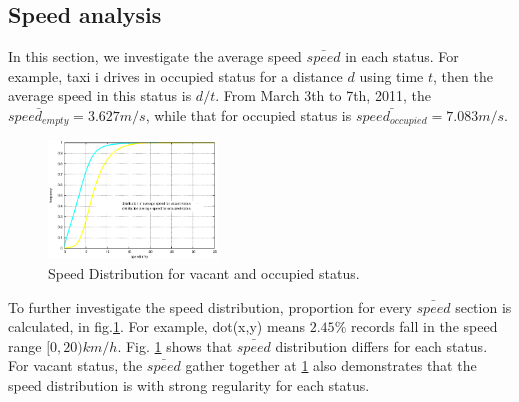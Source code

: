 \subsection{Speed analysis}
In this section, we investigate the average speed $\bar{speed}$ in each status. For example, taxi i drives in occupied status for a distance $d$ using time $t$, then the average speed in this status is $d/t$.
From March 3th to 7th, 2011, the $\bar{speed_{empty}} = 3.627 m/s$, while that for occupied status is $\bar{speed_{occupied}}=7.083 m/s$. 

\begin{figure}
\centering
\includegraphics[width=0.4\textwidth]{figures_201103/assumption/speeddis.eps}
\caption{Speed Distribution for vacant and occupied status.}\label{figure_speed_distribution}
\end{figure}

To further investigate the speed distribution, proportion for every $\bar{speed}$ section is calculated, in fig.\ref{figure_speed_distribution}. For example, dot(x,y) means $2.45\%$ records fall in the speed range $[0,20)km/h$.
Fig. \ref{figure_speed_distribution} shows that $\bar{speed}$ distribution differs for each status. For vacant status, the $\bar{speed}$ gather together at  \ref{figure_speed_distribution} also demonstrates that the speed distribution is with strong regularity for each status.


